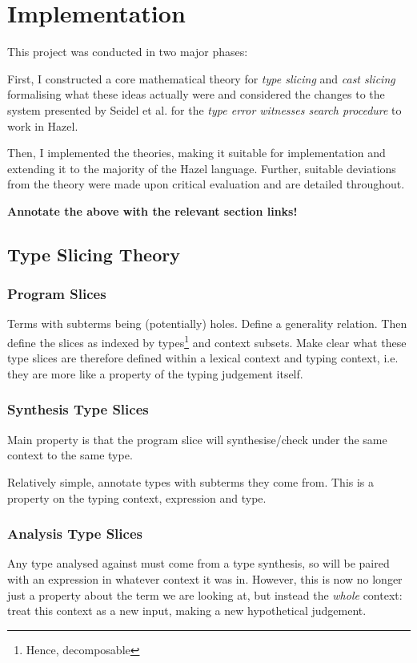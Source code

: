\chapter{Implementation}\label{chap:Implementation}
This project was conducted in two major phases:

First, I constructed a core mathematical theory for \textit{type slicing} and \textit{cast slicing} formalising what these ideas actually were and considered the changes to the system presented by Seidel et al. for the \textit{type error witnesses search procedure} to work in Hazel.  

Then, I implemented the theories, making it suitable for implementation and extending it to the majority of the Hazel language. Further, suitable deviations from the theory were made upon critical evaluation and are detailed throughout.

\textbf{Annotate the above with the relevant section links!}
\section{Type Slicing Theory}\label{sec:TypeSlicingTheory}

\subsection{Program Slices}
Terms with subterms being (potentially) holes. Define a generality relation. Then define the slices as indexed by types\footnote{Hence, decomposable} and context subsets. Make clear what these type slices are therefore defined within a lexical context and typing context, i.e. they are more like a property of the typing judgement itself.

\subsection{Synthesis Type Slices}
\label{sec:SynthesisSlices}
Main property is that the program slice will synthesise/check under the same context to the same type.

Relatively simple, annotate types with subterms they come from. This is a property on the typing context, expression and type.
\subsection{Analysis Type Slices}\label{sec:AnalysisSlices}
Any type analysed against must come from a type synthesis, so will be paired with an expression in whatever context it was in. However, this is now no longer just a property about the term we are looking at, but instead the \textit{whole} context: treat this context as a new input, making a new hypothetical judgement. 

